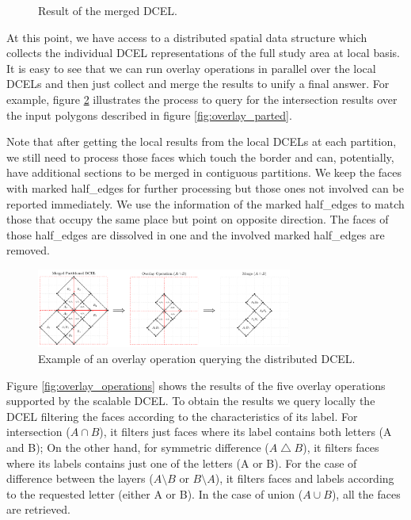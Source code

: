 \begin{figure}[!ht]
    \centering
        
    \caption{Result of the merged DCEL.}\label{fig:merged_dcel}
\end{figure}

At this point, we have access to a distributed spatial data structure which collects the individual DCEL representations of the full study area at local basis.  It is easy to see that we can run overlay operations in parallel over the local DCELs and then just collect and merge the results to unify a final answer.  For example, figure \ref{fig:overlay_parted2} illustrates the process to query for the intersection results over the input polygons described in figure \ref{fig:overlay_parted}.

Note that after getting the local results from the local DCELs at each partition, we still need to process those faces which touch the border and can, potentially, have additional sections to be merged in contiguous partitions.  We keep the faces with marked half\_edges for further processing but those ones not involved can be reported immediately.  We use the information of the marked half\_edges to match those that occupy the same place but point on opposite direction.  The faces of those half\_edges are dissolved in one and the involved marked half\_edges are removed. 

\begin{figure}[!ht]
    \centering
    \includegraphics[width=0.75\textwidth]{figures/03-OverlayParted2}
    \caption{Example of an overlay operation querying the distributed DCEL.}\label{fig:overlay_parted2}
\end{figure}

Figure \ref{fig:overlay_operations} shows the results of the five overlay operations supported by the scalable DCEL.  To obtain the results we query locally the DCEL filtering the faces according to the characteristics of its label.  For intersection ($A \cap B$), it filters just faces where its label contains both letters (A and B); On the other hand, for symmetric difference ($A \bigtriangleup B$), it filters faces where its labels contains just one of the letters (A or B).  For the case of difference between the layers ($A \setminus B$ or $B \setminus A$), it filters faces and labels according to the requested letter (either A or B). In the case of union ($A \cup B$), all the faces are retrieved. 

